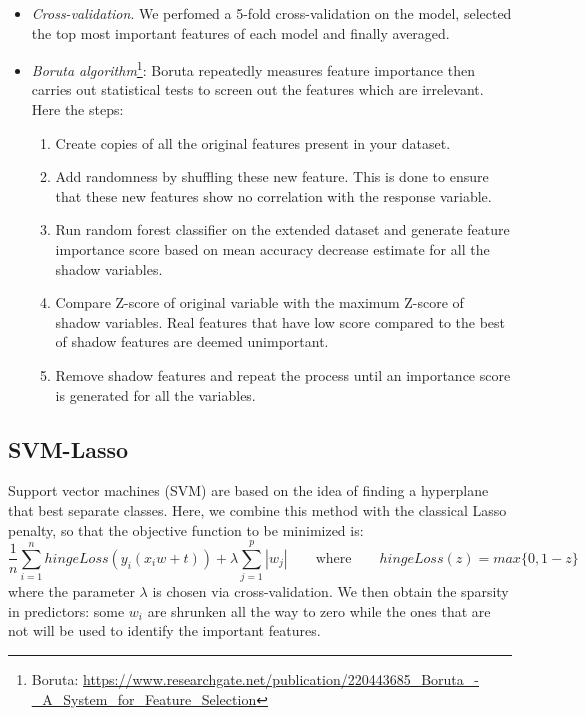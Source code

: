 \documentclass[a4paper,11pt, oneside]{article}  %
\begin{document}
\begin{itemize}
	\item \textit{Cross-validation}. We perfomed a 5-fold cross-validation on the model, selected the top most important features of each model and finally averaged.
	\item \textit{Boruta algorithm}\footnote{Boruta: \url{https://www.researchgate.net/publication/220443685_Boruta_-_A_System_for_Feature_Selection}}: Boruta repeatedly measures feature importance then carries out statistical tests to screen out the features which are irrelevant. Here the steps:
	\begin{enumerate}
	\item Create copies of all the original features present in your dataset.
	\item Add randomness by shuffling these new feature. This is done to ensure that these new features show no correlation with the response variable.
	\item Run random forest classifier on the extended dataset and generate feature importance score based on mean accuracy decrease estimate for all the shadow variables.
	\item Compare Z-score of original variable with the maximum Z-score of shadow variables. Real features that have low score compared to the best of shadow features are deemed unimportant.
	\item Remove shadow features and repeat the process until an importance score is generated for all the variables.
	\end{enumerate}
\end{itemize}


\subsection{SVM-Lasso}
Support vector machines (SVM) are based on the idea of finding a hyperplane that best separate classes. Here, we combine this method with the classical Lasso penalty,  so that the objective function to be minimized is:
\begin{equation*}
	\dfrac{1}{n} \sum_{i=1}^n hingeLoss(y_i(x_i w + t)) + \lambda \sum_{j=1}^p |w_j|  \qquad	\text{where} \qquad  hingeLoss(z) = max\{0, 1-z\}
\end{equation*}
where the parameter $\lambda$ is chosen via cross-validation.  We then obtain the sparsity in predictors: some $w_i$ are shrunken all the way to zero while the ones that are not will be used to identify the important features. 
\end{document}
